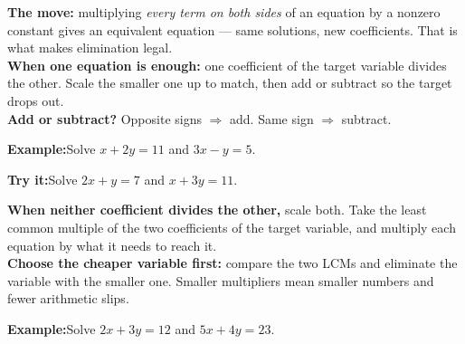 \documentclass[12pt]{article}
\begin{document}


\begin{formulabox}
\textbf{The move:} multiplying \emph{every term on both sides} of an equation by
a nonzero constant gives an equivalent equation --- same solutions, new
coefficients. That is what makes elimination legal.\\[3pt]
\textbf{When one equation is enough:} one coefficient of the target variable
divides the other. Scale the smaller one up to match, then add or subtract so
the target drops out.\\[3pt]
\textbf{Add or subtract?} Opposite signs $\Rightarrow$ add. Same sign
$\Rightarrow$ subtract.
\end{formulabox}

\begin{examplebox}
\textbf{Example:}\quad Solve $x + 2y = 11$ and $3x - y = 5$.
\end{examplebox}

\begin{tryitbox}
\textbf{Try it:}\quad Solve $2x + y = 7$ and $x + 3y = 11$.\\[2pt]
\end{tryitbox}


\begin{formulabox}
\textbf{When neither coefficient divides the other,} scale both. Take the least
common multiple of the two coefficients of the target variable, and multiply
each equation by what it needs to reach it.\\[3pt]
\textbf{Choose the cheaper variable first:} compare the two LCMs and eliminate
the variable with the smaller one. Smaller multipliers mean smaller numbers and
fewer arithmetic slips.
\end{formulabox}

\begin{examplebox}
\textbf{Example:}\quad Solve $2x + 3y = 12$ and $5x + 4y = 23$.
\end{examplebox}
\end{document}
